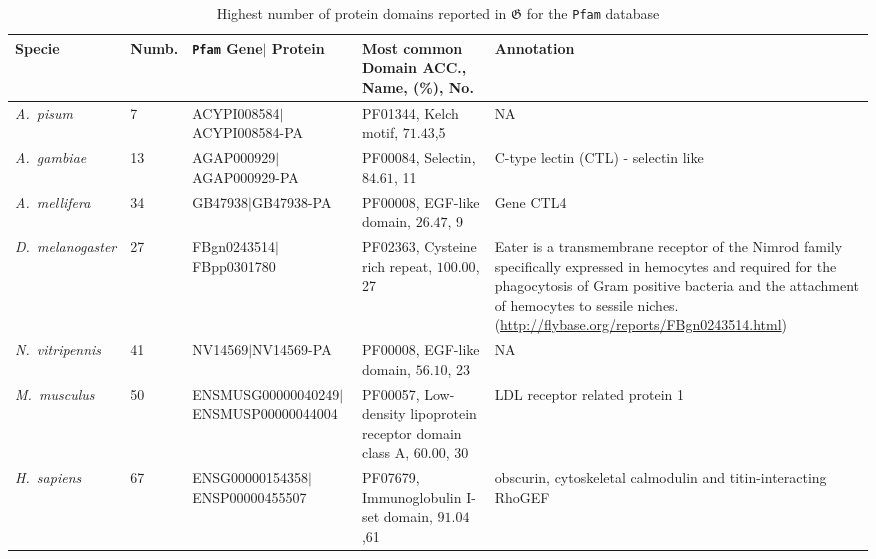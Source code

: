 \documentclass[12pt]{article}
\begin{document}
\begin{table}[ht!]
\begin{center}
\small
\caption{Highest number of protein domains reported in 
$\boldsymbol{\mathfrak{G}}$ for the \texttt{Pfam} database} 
\label{tab:greatestPfamComplete}
\begin{adjustbox}{angle=90}
\begin{tabular}{lp{1.5cm}p{8.5cm}p{3.5cm}p{4.5cm}}
\toprule
\textbf{Specie} & \textbf{Numb.} &\texttt{Pfam} \textbf{Gene$|$ Protein}& 
\textbf{Most common Domain ACC., Name, (\%), No.}& \textbf{Annotation} \\
\midrule
\textit{A.\ pisum} & 7 & ACYPI008584$|$ACYPI008584-PA & PF01344, Kelch motif,  
$71.43$,5 & NA \\
\textit{A.\ gambiae} & 13 & AGAP000929$|$AGAP000929-PA & PF00084, Selectin, 
$84.61$, 11 &
C-type lectin (CTL) - selectin like \\
\textit{A.\ mellifera} & 34 & GB47938$|$GB47938-PA & PF00008, EGF-like 
domain, $26.47$, 9 & Gene CTL4 \\
\textit{D.\ melanogaster} & 27 & FBgn0243514$|$FBpp0301780 & PF02363, Cysteine 
rich repeat, $100.00$, 27 & Eater is a transmembrane receptor of the Nimrod 
family specifically expressed in hemocytes and required for the phagocytosis of 
Gram positive bacteria and the attachment of hemocytes to sessile 
niches.(\url{http://flybase.org/reports/FBgn0243514.html}) \\
\textit{N.\ vitripennis} & 41 & NV14569$|$NV14569-PA & PF00008, EGF-like 
domain, $56.10$, 23& 
NA \\
\midrule
\textit{M.\ musculus} & 50 & ENSMUSG00000040249$|$ENSMUSP00000044004 & 
PF00057, Low-density lipoprotein receptor domain class A, $60.00$, 30 & LDL 
receptor related protein 1 \\
\textit{H.\ sapiens} & 67 & ENSG00000154358$|$ENSP00000455507 & 
PF07679, Immunoglobulin I-set domain, $91.04$,61 & obscurin, cytoskeletal 
calmodulin and titin-interacting RhoGEF \\
\bottomrule
\end{tabular}
\end{adjustbox}
\end{center}
\end{table}
\end{document}
